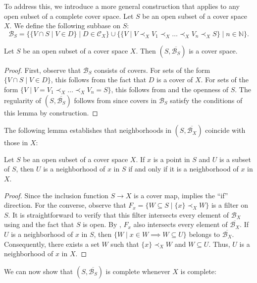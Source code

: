 \documentclass[pdflatex,sn-mathphys-num]{sn-jnl}
\theoremstyle{definition}
\theoremstyle{remark}
\numberwithin{figure}{section}
\newcommand{\rb}{\prec}
\begin{document}
To address this, we introduce a more general construction that applies to any open subset of a complete cover space.
Let $S$ be an open subset of a cover space $X$.
We define the following subbase on $S$:
\[ \mathcal{B}_S = \{ \{ V \cap S \mid V \in D \} \mid D \in \mathcal{C}_X \} \cup \{ \{ V \mid V \rb_X V_1 \rb_X \ldots \rb_X V_n \rb_X S \} \mid n \in \mathbb{N} \}. \]

\begin{lem}
Let $S$ be an open subset of a cover space $X$.
Then $(S,\overline{\mathcal{B}_S})$ is a cover space.
\end{lem}
\begin{proof}
First, observe that $\mathcal{B}_S$ consists of covers.
For sets of the form $\{ V \cap S \mid V \in D \}$, this follows from the fact that $D$ is a cover of $X$.
For sets of the form $\{ V \mid V = V_1 \rb_X \ldots \rb_X V_n = S \}$, this follows from  and the openness of $S$.
The regularity of $(S,\overline{\mathcal{B}_S})$ follows from  since covers in $\mathcal{B}_S$ satisfy the conditions of this lemma by construction.
\end{proof}

The following lemma establishes that neighborhoods in $(S,\overline{\mathcal{B}_X})$ coincide with those in $X$:

\begin{lem}
Let $S$ be an open subset of a cover space $X$.
If $x$ is a point in $S$ and $U$ is a subset of $S$, then $U$ is a neighborhood of $x$ in $S$ if and only if it is a neighborhood of $x$ in $X$.
\end{lem}
\begin{proof}
Since the inclusion function $S \to X$ is a cover map,  implies the ``if'' direction.
For the converse, observe that $F_x = \{ W \subseteq S \mid \{ x \} \rb_X W \}$ is a filter on $S$.
It is straightforward to verify that this filter intersects every element of $\mathcal{B}_X$ using  and the fact that $S$ is open.
By , $F_x$ also intersects every element of $\overline{\mathcal{B}_X}$.
If $U$ is a neighborhood of $x$ in $S$, then $\{ W \mid x \in W \implies W \subseteq U \}$ belongs to $\overline{\mathcal{B}_X}$.
Consequently, there exists a set $W$ such that $\{ x \} \rb_X W$ and $W \subseteq U$.
Thus, $U$ is a neighborhood of $x$ in $X$.
\end{proof}

We can now show that $(S,\overline{\mathcal{B}_S})$ is complete whenever $X$ is complete:
\end{document}
